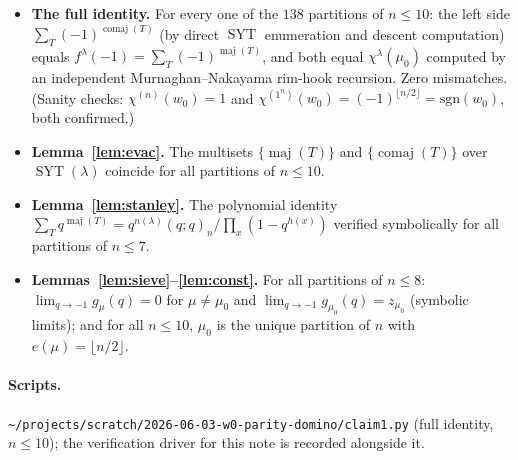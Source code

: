 \documentclass[11pt]{article}
\theoremstyle{definition}
\DeclareMathOperator{\maj}{maj}
\DeclareMathOperator{\comaj}{comaj}
\DeclareMathOperator{\SYT}{SYT}
\newcommand{\wzero}{w_0}
\begin{document}
\begin{itemize}
\item \textbf{The full identity.} For every one of the $138$ partitions of
$n\le 10$: the left side $\sum_T(-1)^{\comaj(T)}$ (by direct $\SYT$ enumeration and
descent computation) equals $f^\lambda(-1)=\sum_T(-1)^{\maj(T)}$, and both equal
$\chi^\lambda(\mu_0)$ computed by an independent Murnaghan--Nakayama rim-hook
recursion. Zero mismatches.  (Sanity checks: $\chi^{(n)}(\wzero)=1$ and
$\chi^{(1^n)}(\wzero)=(-1)^{\lfloor n/2\rfloor}=\mathrm{sgn}(\wzero)$, both confirmed.)

\item \textbf{Lemma~\ref{lem:evac}.} The multisets $\{\maj(T)\}$ and $\{\comaj(T)\}$
over $\SYT(\lambda)$ coincide for all partitions of $n\le10$.

\item \textbf{Lemma~\ref{lem:stanley}.} The polynomial identity
$\sum_T q^{\maj(T)}=q^{n(\lambda)}(q;q)_n/\prod_x(1-q^{h(x)})$ verified symbolically
for all partitions of $n\le7$.

\item \textbf{Lemmas~\ref{lem:sieve}--\ref{lem:const}.} For all partitions of
$n\le8$: $\lim_{q\to-1}g_\mu(q)=0$ for $\mu\neq\mu_0$ and
$\lim_{q\to-1}g_{\mu_0}(q)=z_{\mu_0}$ (symbolic limits); and for all $n\le10$,
$\mu_0$ is the unique partition of $n$ with $e(\mu)=\lfloor n/2\rfloor$.
\end{itemize}

\paragraph{Scripts.}
\texttt{\~{}/projects/scratch/2026-06-03-w0-parity-domino/claim1.py} (full identity,
$n\le10$); the verification driver for this note is recorded alongside it.
\end{document}
